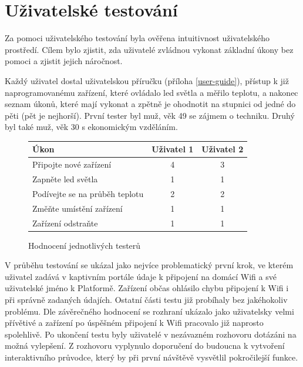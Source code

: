

\section{Uživatelské testování}
Za pomoci uživatelského testování byla ověřena intuitivnost uživatelského prostředí. Cílem bylo zjistit, zda uživatelé zvládnou vykonat základní úkony bez pomoci a zjistit jejich náročnost.

Každý uživatel dostal uživatelskou příručku (příloha \ref{user-guide}), přístup k již naprogramovanému zařízení, které ovládalo led světla a měřilo teplotu, a nakonec seznam úkonů, které mají vykonat a zpětně je ohodnotit na stupnici od jedné do pěti (pět je nejhorší). První tester byl muž, věk 49 se zájmem o techniku. Druhý byl také muž, věk 30 s ekonomickým vzděláním.


\begin{figure}
    \centering
    \begin{tabular}{ | l | c | c | }
        \hline
        Úkon                           & Uživatel 1 & Uživatel 2 \\
        \hline
        Připojte nové zařízení         & 4          & 3          \\
        \hline
        Zapněte led světla             & 1          & 1          \\
        \hline
        Podívejte se na průběh teplotu & 2          & 2          \\
        \hline
        Změňte umístění zařízení       & 1          & 1          \\
        \hline
        Zařízení odstraňte             & 1          & 1          \\
        \hline
    \end{tabular}
    \caption{Hodnocení jednotlivých testerů}
\end{figure}

V průběhu testování se ukázal jako nejvíce problematický první krok, ve kterém uživatel zadává v kaptivním portále údaje k připojení na domácí Wifi a své uživatelské jméno k Platformě. Zařízení občas ohlásilo chybu připojení k Wifi i při správně zadaných údajích. Ostatní části testu již probíhaly bez jakéhokoliv problému. Dle závěrečného hodnocení se rozhraní ukázalo jako uživatelsky velmi přívětivé a zařízení po úspěšném připojení k Wifi pracovalo již naprosto spolehlivě. Po ukončení testu byly uživatelé v nezávazném rozhovoru dotázáni na možná vylepšení. Z rozhovoru vyplynulo doporučení do budoucna k vytvoření interaktivního průvodce, který by při první návštěvě vysvětlil pokročilejší funkce.

